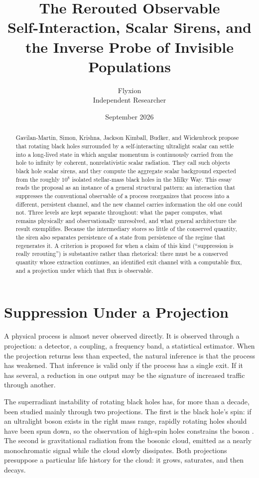 \documentclass[11pt]{article}
\title{The Rerouted Observable\\[0.3em]
\large Self-Interaction, Scalar Sirens, and the Inverse Probe of Invisible Populations}
\author{Flyxion\\ \small Independent Researcher}
\date{September 2026}
\begin{document}
\maketitle

\begin{abstract}
Gavilan-Martin, Simon, Krishna, Jackson Kimball, Budker, and Wickenbrock propose that rotating black holes surrounded by a self-interacting ultralight scalar can settle into a long-lived state in which angular momentum is continuously carried from the hole to infinity by coherent, nonrelativistic scalar radiation. They call such objects black hole scalar sirens, and they compute the aggregate scalar background expected from the roughly $10^{8}$ isolated stellar-mass black holes in the Milky Way. This essay reads the proposal as an instance of a general structural pattern: an interaction that suppresses the conventional observable of a process reorganizes that process into a different, persistent channel, and the new channel carries information the old one could not. Three levels are kept separate throughout: what the paper computes, what remains physically and observationally unresolved, and what general architecture the result exemplifies. Because the intermediary stores so little of the conserved quantity, the siren also separates persistence of a state from persistence of the regime that regenerates it. A criterion is proposed for when a claim of this kind (``suppression is really rerouting'') is substantive rather than rhetorical: there must be a conserved quantity whose extraction continues, an identified exit channel with a computable flux, and a projection under which that flux is observable.
\end{abstract}

\section{Suppression Under a Projection}

A physical process is almost never observed directly. It is observed through a projection: a detector, a coupling, a frequency band, a statistical estimator. When the projection returns less than expected, the natural inference is that the process has weakened. That inference is valid only if the process has a single exit. If it has several, a reduction in one output may be the signature of increased traffic through another.

The superradiant instability of rotating black holes has, for more than a decade, been studied mainly through two projections. The first is the black hole's spin: if an ultralight boson exists in the right mass range, rapidly rotating holes should have been spun down, so the observation of high-spin holes constrains the boson \cite{ArvanitakiDubovsky2011,ArvanitakiBaryakhtarHuang2015}. The second is gravitational radiation from the bosonic cloud, emitted as a nearly monochromatic signal while the cloud slowly dissipates. Both projections presuppose a particular life history for the cloud: it grows, saturates, and then decays.
\end{document}

